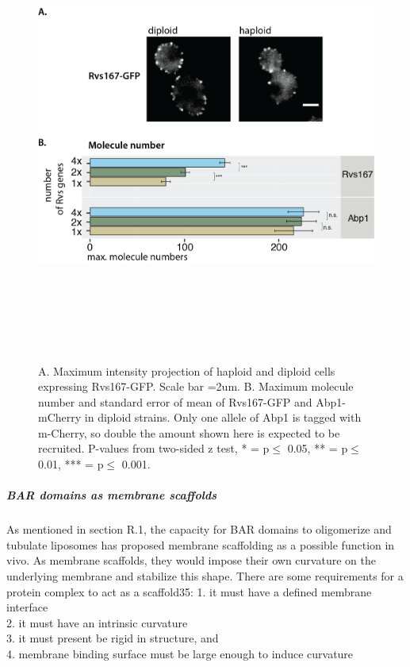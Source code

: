 						\begin{figure}[H]
	\centering
	\includegraphics[width=15cm,height=15cm,keepaspectratio]{figures/results_final/protein_frictionB}
	\vspace*{2mm}
	\caption[Abp1 ]
	{A. Maximum intensity projection of haploid and diploid cells expressing Rvs167-GFP. Scale bar =2um.      
	B. Maximum molecule number and standard error of mean of Rvs167-GFP and Abp1-mCherry in diploid strains. Only one allele of Abp1 is tagged with m-Cherry, so double the amount shown here is expected to be recruited. P-values from two-sided z test,  * = p$\leq$ 0.05, ** = p$\leq$ 0.01, *** = p$\leq$ 0.001. 
		\label{fig_rvsdiploid}}
\end{figure}



\newpage
	\subparagraph{BAR domains as membrane scaffolds}
	As mentioned in section R.1, the capacity for BAR domains to oligomerize and tubulate liposomes has proposed membrane scaffolding as a possible function in vivo. As membrane scaffolds, they would impose their own curvature on the underlying membrane and stabilize this shape. There are some requirements for a protein complex to act as a scaffold35:
	1. it must have a defined membrane interface\\
	2. it must have an intrinsic curvature\\
	3. it must present be rigid in structure, and\\
	4. membrane binding surface must be large enough to induce curvature\\

